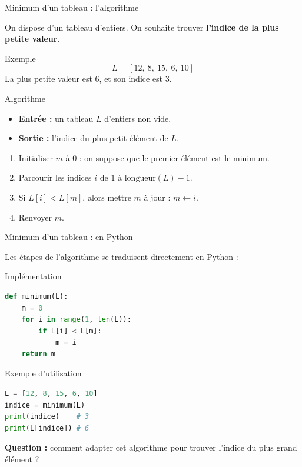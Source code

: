 \documentclass[10pt]{beamer}
\begin{document}
\begin{frame}{Minimum d'un tableau : l'algorithme}

On dispose d'un tableau d'entiers. On souhaite trouver
\textbf{l'indice de la plus petite valeur}.

\begin{exampleblock}{Exemple}
\[
L = [12,\ 8,\ 15,\ 6,\ 10]
\]
La plus petite valeur est $6$, et son indice est $3$.
\end{exampleblock}

\pause

\begin{block}{Algorithme}
\begin{itemize}
    \item \textbf{Entrée :} un tableau $L$ d'entiers non vide.
    \item \textbf{Sortie :} l'indice du plus petit élément de $L$.
\end{itemize}

\medskip
\begin{enumerate}
    \item Initialiser $m$ à $0$ : on suppose que le premier élément est le minimum.
    \item Parcourir les indices $i$ de $1$ à $\text{longueur}(L)-1$.
    \item Si $L[i] < L[m]$, alors mettre $m$ à jour : $m \leftarrow i$.
    \item Renvoyer $m$.
\end{enumerate}
\end{block}

\end{frame}
\begin{frame}[fragile]{Minimum d'un tableau : en Python}

Les étapes de l'algorithme se traduisent directement en Python :

\begin{exampleblock}{Implémentation}
\begin{lstlisting}[language=Python]
def minimum(L):
    m = 0
    for i in range(1, len(L)):
        if L[i] < L[m]:
            m = i
    return m
\end{lstlisting}
\end{exampleblock}
\begin{exampleblock}{Exemple d'utilisation}
\begin{lstlisting}[language=Python]
L = [12, 8, 15, 6, 10]
indice = minimum(L)
print(indice)    # 3
print(L[indice]) # 6
\end{lstlisting}
\end{exampleblock}

\textbf{Question :} comment adapter cet algorithme pour trouver
l'indice du plus grand élément ?

\end{frame}
\end{document}
